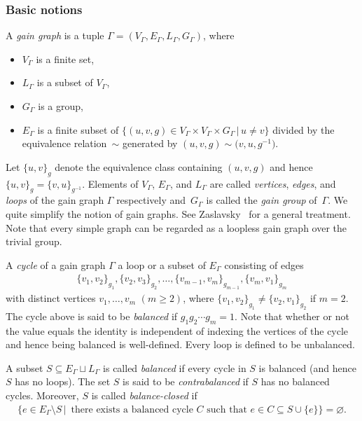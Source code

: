 \documentclass[pdftex]{sigma}
\numberwithin{equation}{section}
\begin{document}
\subsubsection{Basic notions}
A \textit{gain graph} is a tuple $ \Gamma = (V_{\Gamma}, E_{\Gamma}, L_{\Gamma}, G_{\Gamma}) $, where
\begin{itemize}\itemsep=0pt
\item $ V_{\Gamma} $ is a finite set,
\item $ L_{\Gamma} $ is a subset of $ V_{\Gamma} $,
\item $ G_{\Gamma} $ is a group,
\item $ E_{\Gamma} $ is a finite subset of $ \{ (u,v,g) \in V_{\Gamma} \times V_{\Gamma} \times G_{\Gamma} \,|\, u \neq v \} $ divided by the equivalence relation~$ \sim $ generated by $ (u,v, g) \sim \big(v,u, g^{-1}\big) $.
\end{itemize}
Let $ \{u,v\}_{g} $ denote the equivalence class containing $ (u,v,g) $ and hence $ \{u,v\}_{g} = \{v,u\}_{g^{-1}} $.
Elements of $ V_{\Gamma}$, $E_{\Gamma}$, and $ L_{\Gamma} $ are called \textit{vertices}, \textit{edges}, and \textit{loops} of the gain graph $ \Gamma $ respectively and~$ G_{\Gamma} $ is called the \textit{gain group} of~$ \Gamma $.
We quite simplify the notion of gain graphs. See Zaslavsky~\cite{zaslavsky1989biased-joctsb} for a general treatment.
Note that every simple graph can be regarded as a loopless gain graph over the trivial group.

A \textit{cycle} of a gain graph $ \Gamma $ a loop or a subset of $ E_{\Gamma} $ consisting of edges
\begin{gather*}
\{v_{1}, v_{2} \}_{g_{1}}, \{v_{2}, v_{3} \}_{g_{2}}, \dots, \{v_{m-1}, v_{m} \}_{g_{m-1}}, \{v_{m}, v_{1} \}_{g_{m}}
\end{gather*}
with distinct vertices $ v_{1}, \dots, v_{m}$ $(m \geq 2) $, where $ \{v_{1}, v_{2} \}_{g_{1}} \neq \{v_{2}, v_{1} \}_{g_{2}} $ if $ m=2 $. The cycle above is said to be \textit{balanced} if $ g_{1}g_{2} \cdots g_{m} = 1 $.
Note that whether or not the value equals the identity is independent of indexing the vertices of the cycle and hence being balanced is well-defined. Every loop is defined to be unbalanced.

A subset $ S \subseteq E_{\Gamma} \sqcup L_{\Gamma} $ is called \textit{balanced} if every cycle in $ S $ is balanced (and hence $ S $ has no loops). The set $ S $ is said to be \textit{contrabalanced} if $ S $ has no balanced cycles.
Moreover, $ S $ is called \textit{balance-closed} if
\begin{align*}
\{ e \in E_{\Gamma} \setminus S \,|\, \text{ there exists a balanced cycle } C \text{ such that } e \in C \subseteq S \cup \{e\}\} = \varnothing.
\end{align*}
\end{document}
